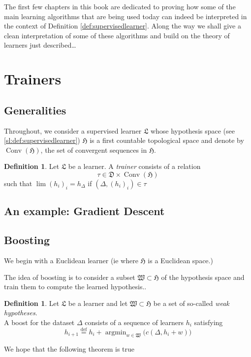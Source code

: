 \documentclass{book}
\theoremstyle{plain}
\theoremstyle{definition}
\newtheorem{definition}[corollary]{Definition}
\DeclareMathOperator{\argmin}{argmin}
\DeclareMathOperator{\Conv}{Conv}
\newcommand{\define}{\stackrel{\operatorname{def}}{=}}
\newcommand{\f}[1]{\mathfrak{#1}}
\begin{document}
\noindent The first few chapters in this book are dedicated to proving how some of the main learning algorithms that are being used today can indeed be interpreted in the context of Definition \ref{def:supervisedlearner}. Along the way we shall give a clean interpretation of some of these algorithms and build on the theory of learners just described\ldots
\section{Trainers}
\subsection{Generalities}

Throughout, we consider a supervised learner $\f{L}$ whose hypothesis space (see \ref{sl:def:supervisedlearner}) $\f{H}$ is a first countable topological space and denote by $\Conv(\f{H})$, the set of convergent sequences in $\f{H}$.\\

\begin{definition}
Let $\f{L}$ be a learner. A \emph{trainer} consists of a relation
\[
\tau \in \f{D}\times \Conv(\f{H})
\]
such that $\lim (h_i)_i =h_\Delta$ if $(\Delta,(h_i)_i)\in \tau$
\end{definition}
\subsection{An example: Gradient Descent}

\subsection{Boosting}

We begin with a Euclidean learner (ie where $\f{H}$ is a Euclidean space.)

The idea of boosting is to consider a subset $\f{W}\subset \f{H}$ of the hypothesis space and train them to compute the learned hypothesis..

\begin{definition}
Let $\f{L}$ be a learner and let $\f{W}\subset \f{H}$ be a set of so-called \emph{weak hypotheses}.\\
A boost for the dataset $\Delta $ consists of a sequence of learners $h_i$ satisfying
\[
h_{i+1} \define h_i+\argmin_{w\in \f{W}}\bigg(c(\Delta, h_i+w)\bigg)
\]
\end{definition}

\noindent We hope that the following theorem is true
\end{document}
